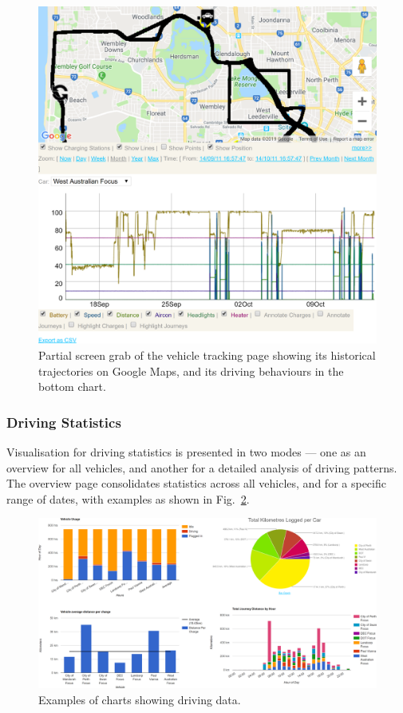 \begin{figure}[H]
	\centering
	\includegraphics[width=0.9\linewidth]{vt-t-vis-vt}
	\caption[Vehicle tracking page screen grab]{Partial screen grab of the vehicle tracking page showing its historical trajectories on Google Maps, and its driving behaviours in the bottom chart.}
	\label{fig:9:vt:vis:vt}
\end{figure}

\subsubsection{Driving Statistics}
Visualisation for driving statistics is presented in two modes --- one as an overview for all vehicles, and another for a detailed analysis of driving patterns. The overview page consolidates statistics across all vehicles, and for a specific range of dates, with examples as shown in Fig.~\ref{fig:9:vt-t-vis-ds1}.

\begin{figure}[H]
	\centering
	\includegraphics[width=\linewidth]{vt-t-vis-ds1-crop}
	\caption{Examples of charts showing driving data.}
	\label{fig:9:vt-t-vis-ds1}
\end{figure}


